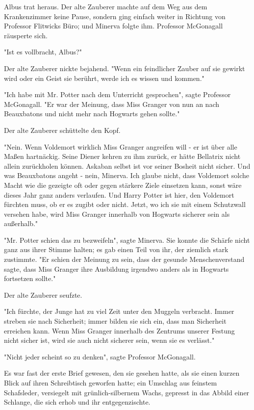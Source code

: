 {Albus trat heraus. Der alte Zauberer machte auf dem Weg aus dem Krankenzimmer keine Pause, sondern ging einfach weiter in Richtung von Professor Flitwicks Büro; und Minerva folgte ihm. Professor McGonagall räusperte sich.

"Ist es vollbracht, Albus?"

Der alte Zauberer nickte bejahend. "Wenn ein feindlicher Zauber auf sie gewirkt wird oder ein Geist sie berührt, werde ich es wissen und kommen."

"Ich habe mit Mr. Potter nach dem Unterricht gesprochen", sagte Professor McGonagall. "Er war der Meinung, dass Miss Granger von nun an nach Beauxbatons und nicht mehr nach Hogwarts gehen sollte."

Der alte Zauberer schüttelte den Kopf.

"Nein. Wenn Voldemort wirklich Miss Granger angreifen will - er ist über alle Maßen hartnäckig. Seine Diener kehren zu ihm zurück, er hätte Bellatrix nicht allein zurückholen können. Askaban selbst ist vor seiner Bosheit nicht sicher. Und was Beauxbatons angeht - nein, Minerva. Ich glaube nicht, dass Voldemort solche Macht wie die gezeigte oft oder gegen stärkere Ziele einsetzen kann, sonst wäre dieses Jahr ganz anders verlaufen. Und Harry Potter ist hier, den Voldemort fürchten muss, ob er es zugibt oder nicht. Jetzt, wo ich sie mit einem Schutzwall versehen habe, wird Miss Granger innerhalb von Hogwarts sicherer sein als außerhalb."

"Mr. Potter schien das zu bezweifeln", sagte Minerva. Sie konnte die Schärfe nicht ganz aus ihrer Stimme halten; es gab einen Teil von ihr, der ziemlich stark zustimmte. "Er schien der Meinung zu sein, dass der gesunde Menschenverstand sagte, dass Miss Granger ihre Ausbildung irgendwo anders als in Hogwarts fortsetzen sollte."

Der alte Zauberer seufzte.

"Ich fürchte, der Junge hat zu viel Zeit unter den Muggeln verbracht. Immer streben sie nach Sicherheit; immer bilden sie sich ein, dass man Sicherheit erreichen kann. Wenn Miss Granger innerhalb des Zentrums unserer Festung nicht sicher ist, wird sie auch nicht sicherer sein, wenn sie es verlässt."

"Nicht jeder scheint so zu denken", sagte Professor McGonagall.

Es war fast der erste Brief gewesen, den sie gesehen hatte, als sie einen kurzen Blick auf ihren Schreibtisch geworfen hatte; ein Umschlag aus feinstem Schafsleder, versiegelt mit grünlich-silbernem Wachs, gepresst in das Abbild einer Schlange, die sich erhob und ihr entgegenzischte.

}
